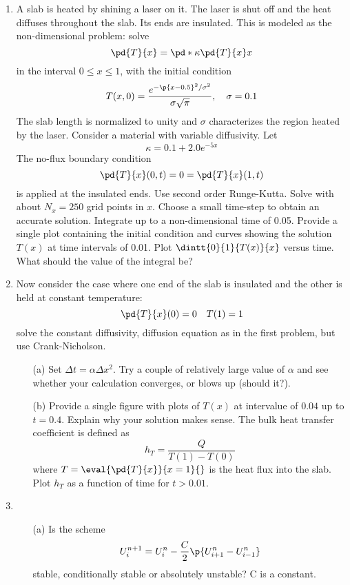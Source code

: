 \documentclass[11pt, oneside]{article}
\begin{document}
\begin{enumerate}
  \item %
    A slab is heated by shining a laser on it.
    The laser is shut off and the heat diffuses throughout the slab.
    Its ends are insulated.
    This is modeled as the non-dimensional problem: solve
    \[
      \pd{T}{x} = \pd*{\kappa \pd{T}{x}}{x}
    \]
    in the interval $0 \le x \le 1$, with the initial condition
    \[
      T(x, 0) = \frac{e^{-\p{x - 0.5}^2/\sigma^2}}{\sigma \sqrt{\pi}}, \quad \sigma = 0.1
    \]
    The slab length is normalized to unity and $\sigma$ characterizes the
    region heated by the laser.
    Consider a material with variable diffusivity.
    Let
    \[
      \kappa = 0.1 + 2.0 e^{-5x}
    \]
    The no-flux boundary condition
    \[
      \pd{T}{x}(0, t) = 0 = \pd{T}{x}(1, t)
    \]
    is applied at the insulated ends.
    Use second order Runge-Kutta.
    Solve with about $N_x = 250$ grid points in $x$.
    Choose a small time-step to obtain an accurate solution.
    Integrate up to a non-dimensional time of 0.05.
    Provide a single plot containing the initial condition and curves showing
    the solution $T(x)$ at time intervals of 0.01.
    Plot $\dintt{0}{1}{T(x)}{x}$ versus time.
    What should the value of the integral be?

  \item %
    Now consider the case where one end of the slab is insulated and the other
    is held at constant temperature:
    \[
      \pd{T}{x}(0) = 0 \quad T(1) = 1
    \]
    solve the constant diffusivity, diffusion equation as in the first problem,
    but use Crank-Nicholson.
    \begin{enumerate}
      \item[(a)]
        Set $\Delta t = \alpha \Delta x^2$.
        Try a couple of relatively large value of $\alpha$ and see whether your
        calculation converges, or blows up (should it?).

      \item[(b)]
        Provide a single figure with plots of $T(x)$ at intervalue of $0.04$ up to $t = 0.4$.
        Explain why your solution makes sense.
        The bulk heat transfer coefficient is defined as
        \[
          h_T = \frac{Q}{T(1) - T(0)}
        \]
        where $T = \eval{\pd{T}{x}}{x = 1}{}$ is the heat flux into the slab.
        Plot $h_T$ as a function of time for $t > 0.01$.
    \end{enumerate}

  \item %
    \begin{enumerate}
      \item[(a)]
        Is the scheme
        \[
          U_i^{n+1} = U_i^n - \frac{C}{2} \p{U_{i+1}^n - U_{i-1}^n}
        \]
        stable, conditionally stable or absolutely unstable?
        C is a constant.


\end{enumerate}
\end{enumerate}
\end{document}

